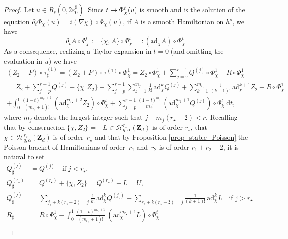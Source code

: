\documentclass[11pt]{article}
\newcommand\mto{\mathchoice{\longmapsto}{\mapsto}{\mapsto}{\mapsto}}
\theoremstyle{definition}
\begin{document}
\begin{proof}
Let $u\in B_s(0,2 \varepsilon_0^\sharp)$. Since $t\mto \Phi_\chi^t(u)$ is smooth and is the solution of the equation $\partial_t \Phi_\chi(u) = i (\nabla \chi)\circ \Phi_\chi(u)$, if $A$ is a smooth Hamiltonian on $h^s$, we have\vspace*{-3pt}
\[
\partial_t A \circ \Phi_\chi^t:= \{\chi, A \} \circ \Phi_\chi^t=: (\mathrm{ad}_{\chi} A) \circ \Phi_\chi^t.
\]
As a consequence, realizing a Taylor expansion in $t=0$ (and omitting the evaluation in $u$) we have\vspace*{-11pt}
\begin{multline*}
(Z_2+P)\circ \tau^{(1)}_\sharp = (Z_2+P)\circ \tau^{(1)} \circ \Phi_\chi^1
= Z_2 \circ \Phi_\chi^1 + \sum_{j=p}^{r-1} Q^{(j)} \circ \Phi_\chi^1 + R \circ \Phi_\chi^1 \\[-2pt]
= Z_2 + \sum_{j=p}^{r-1} Q^{(j)} + \{\chi,Z_2\} + \sum_{j=p}^{r-1} \sum_{k=1}^{m_{j}} \frac1{k !}\, \mathrm{ad}_{\chi}^k Q^{(j)} + \sum_{k=1}^{m_{r_\star}} \frac1{(k+1) !}\, \mathrm{ad}_{\chi}^{k+1} Z_2 + R \circ \Phi_\chi^1 \\[-2pt]
+ \int_0^1 \frac{(1-t)^{m_{r_\star} +1 }}{(m_{r_\star} +1) !}\, (\mathrm{ad}_{\chi}^{m_{r_\star} +2} Z_2)\circ \Phi_\chi^t + \sum_{j=p}^{r-1} \frac{(1-t)^{m_j}}{m_j !}\, (\mathrm{ad}_{\chi}^{m_j+1} Q^{(j)}) \circ \Phi_\chi^t \ \mathrm{d}t,
\end{multline*}
where $m_j$ denotes the largest integer such that $j+m_j (r_\star -2) < r$. Recalling that by construction $\{\chi,Z_2\} = -L \in \mathscr{H}_{q,\alpha}^{r_\star}(\mathbf{Z}_d)$ is of order $r_\star$, that $\chi \in \mathscr{H}_{q,\alpha}^{r_\star}(\mathbf{Z}_d)$ is of order~$r_\star$ and that by Proposition \ref{prop_stable_Poisson} the Poisson bracket of Hamiltonians of order~$r_1$ and~$r_2$ is of order $r_1+r_2-2$, it is natural to set\vspace*{-1pt}
\begin{align*}
Q^{(j)}_\sharp &= Q^{(j)} \quad \text{if } j < r_\star,\\[-2pt]
Q^{(r_\star)}_\sharp &= Q^{(r_\star)}+ \{\chi,Z_2\} = Q^{(r_\star)} - L =U,\\[-2pt]
Q^{(j)}_\sharp &= \sum_{ j_\star+k(r_\star - 2)= j} \frac1{k !}\, \mathrm{ad}_{\chi}^k Q^{(j_\star)} - \sum_{ r_\star+k(r_\star - 2)= j} \frac1{(k+1) !}\, \mathrm{ad}_{\chi}^k L \quad \text{if } j > r_\star,\\
R_\sharp&= R \circ \Phi_\chi^1
- \int_0^1 \frac{(1-t)^{m_{r_\star} +1 }}{(m_{r_\star} +1) !}\, (\mathrm{ad}_{\chi}^{m_{r_\star} +1} L)\circ \Phi_\chi^t\\[-5pt]

\end{align*}
\end{proof}
\end{document}

